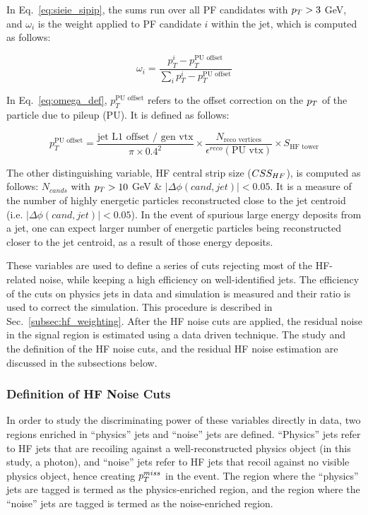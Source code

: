 In Eq.~\ref{eq:sieie_sipip}, the sums run over all PF candidates with $p_T > 3$ GeV, and 
$\omega_i$ is the weight applied to PF candidate $i$ within the jet, which is computed as follows:

\begin{equation}
    \omega_i = \frac{p_T^i - p_T^{\text{PU offset}}}{\sum_{i} p_T^{i} - p_T^{\text{PU offset}} }
    \label{eq:omega_def}
\end{equation}

In Eq.~\ref{eq:omega_def}, $p_T^{\text{PU offset}}$ refers to the offset correction on the $p_T$ of the particle 
due to pileup (PU). It is defined as follows:

\begin{equation}
    p_T^{\text{PU offset}} = \frac{\text{jet L1 offset / gen vtx}}{\pi \times 0.4^2} \times \frac{N_{\text{reco vertices}}}{\epsilon^{reco}(\text{PU vtx})} \times S_{\text{HF tower}}
\end{equation}

The other distinguishing variable, HF central strip size ($CSS_{HF}$), is computed as follows: 
$N_{cands}$ with $p_T > 10$ GeV \& $|\Delta\phi(cand,jet)| < 0.05$. It is a measure of the number of
highly energetic particles reconstructed close to the jet centroid (i.e. $|\Delta\phi(cand,jet)| < 0.05$).
In the event of spurious large energy deposits from a jet, one can expect larger number of energetic particles
being reconstructed closer to the jet centroid, as a result of those energy deposits.

These variables are used to define a series of cuts rejecting most of the HF-related noise, while keeping a high efficiency on well-identified jets. 
The efficiency of the cuts on physics jets in data and simulation is measured and their ratio is used to correct the simulation.
This procedure is described in Sec.~\ref{subsec:hf_weighting}. After the HF noise cuts are applied, the residual noise in the signal region is estimated using a data driven technique.
The study and the definition of the HF noise cuts, and the residual HF noise estimation are discussed in the subsections below. 

\subsubsection{Definition of HF Noise Cuts}

In order to study the discriminating power of these variables directly in data, two regions enriched in ``physics'' jets and ``noise'' jets are defined. ``Physics'' jets
refer to HF jets that are recoiling against a well-reconstructed physics object (in this study, a photon), and ``noise'' jets 
refer to HF jets that recoil against no visible physics object, hence creating $p_T^{miss}$ in the event. The region where the ``physics'' jets are tagged
is termed as the physics-enriched region, and the region where the ``noise'' jets are tagged is termed as the noise-enriched region.

